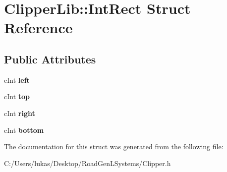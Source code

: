 \hypertarget{struct_clipper_lib_1_1_int_rect}{}\section{Clipper\+Lib\+:\+:Int\+Rect Struct Reference}
\label{struct_clipper_lib_1_1_int_rect}
\subsection*{Public Attributes}
\begin{DoxyCompactItemize}
\item 
\hypertarget{struct_clipper_lib_1_1_int_rect_a9bf519994ffc7d1d5752fb1e2411b4cd}{}\label{struct_clipper_lib_1_1_int_rect_a9bf519994ffc7d1d5752fb1e2411b4cd} 
c\+Int {\bfseries left}
\item 
\hypertarget{struct_clipper_lib_1_1_int_rect_a07154695bf2313182400f829ba07c3a9}{}\label{struct_clipper_lib_1_1_int_rect_a07154695bf2313182400f829ba07c3a9} 
c\+Int {\bfseries top}
\item 
\hypertarget{struct_clipper_lib_1_1_int_rect_a28c68b5f806a88a187a53f3956954e74}{}\label{struct_clipper_lib_1_1_int_rect_a28c68b5f806a88a187a53f3956954e74} 
c\+Int {\bfseries right}
\item 
\hypertarget{struct_clipper_lib_1_1_int_rect_a9da9418de5faa7eba55e8ee98a13ea0e}{}\label{struct_clipper_lib_1_1_int_rect_a9da9418de5faa7eba55e8ee98a13ea0e} 
c\+Int {\bfseries bottom}
\end{DoxyCompactItemize}


The documentation for this struct was generated from the following file\+:\begin{DoxyCompactItemize}
\item 
C\+:/\+Users/lukas/\+Desktop/\+Road\+Gen\+L\+Systems/Clipper.\+h\end{DoxyCompactItemize}
